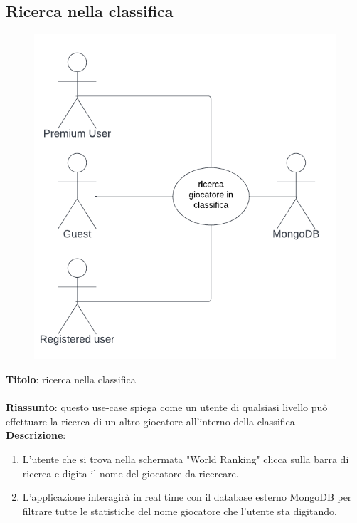 \newpage
\subsection{Ricerca nella classifica} \label{req_ricerca_classifica}
\begin{figure}[!h]
\centering
\includegraphics[scale=0.35]{images/use_case_ricerca_giocatore_classifica.png}
\end{figure}
\noindent
\textbf{Titolo}: ricerca nella classifica \\
\\
\textbf{Riassunto}: questo use-case spiega come un utente di qualsiasi livello può effettuare la ricerca di un altro giocatore all'interno della classifica \\
\textbf{Descrizione}:
\begin{enumerate}
    \item L'utente che si trova nella schermata "World Ranking" clicca sulla barra di ricerca e digita il nome del giocatore da ricercare.
    \item L'applicazione interagirà in real time con il database esterno MongoDB per filtrare tutte le statistiche del nome giocatore che l'utente sta digitando.
\end{enumerate}


